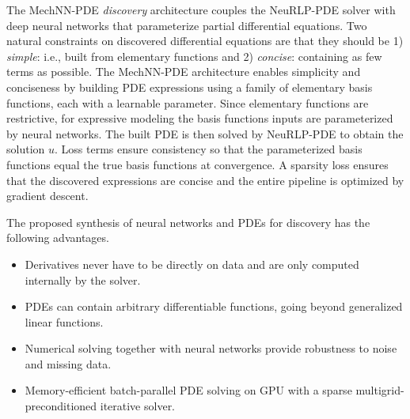 The MechNN-PDE \emph{discovery} architecture couples the NeuRLP-PDE solver with deep neural networks that parameterize partial differential equations.
Two natural constraints on discovered differential equations are that they should be 1) \emph{simple}: i.e., built from elementary functions and 2) \emph{concise}: containing as few terms as possible. 
The MechNN-PDE architecture enables simplicity and conciseness by building PDE expressions using a family of elementary basis functions, each with a learnable parameter.
Since elementary functions are restrictive, for expressive modeling the basis functions inputs are parameterized by neural networks.
The built PDE is then solved by NeuRLP-PDE to obtain the solution $u$.
Loss terms ensure consistency so that the parameterized basis functions equal the true basis functions at convergence.
A sparsity loss ensures that the discovered expressions are concise and the entire pipeline is optimized by gradient descent.

The proposed synthesis of neural networks and PDEs for discovery has the following advantages.
\begin{itemize}
\item Derivatives never have to be directly on data and are only computed internally by the solver.
\item PDEs can contain arbitrary differentiable functions, going beyond generalized linear functions.
\item Numerical solving together with neural networks provide robustness to noise and missing data.
\item Memory-efficient batch-parallel PDE solving on GPU with a sparse multigrid-preconditioned iterative solver.
\end{itemize}

